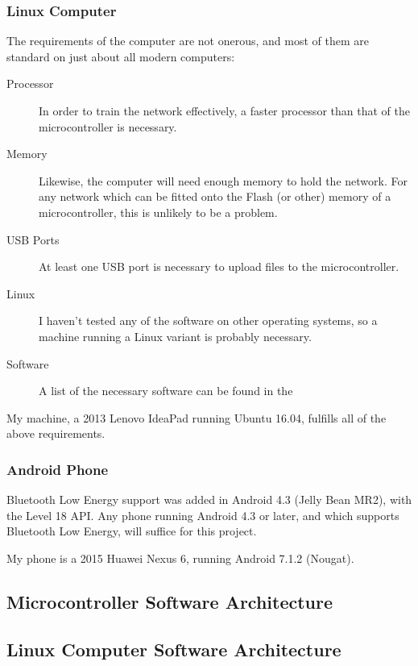 \documentclass[a4paper]{article}
\begin{document}
\subsubsection{Linux Computer}

The requirements of the computer are not onerous, and most of them are standard on just about all modern computers:

\begin{description}
\item[Processor] In order to train the network effectively, a faster processor than that of the microcontroller is necessary. 
\item[Memory] Likewise, the computer will need enough memory to hold the network. For any network which can be fitted onto the Flash (or other) memory of a microcontroller, this is unlikely to be a problem.
\item[USB Ports] At least one USB port is necessary to upload files to the microcontroller.
\item[Linux] I haven't tested any of the software on other operating systems, so a machine running a Linux variant is probably necessary.
\item[Software] A list of the necessary software can be found in the 
\end{description}

My machine, a 2013 Lenovo IdeaPad running Ubuntu 16.04, fulfills all of the above requirements.

\subsubsection{Android Phone}

Bluetooth Low Energy support was added in Android 4.3 (Jelly Bean MR2), with the Level 18 API.\cite{dsref5} Any phone running Android 4.3 or later, and which supports Bluetooth Low Energy, will suffice for this project.

My phone is a 2015 Huawei Nexus 6, running Android 7.1.2 (Nougat).

\subsection{Microcontroller Software Architecture}%


\subsection{Linux Computer Software Architecture}%
\end{document}
